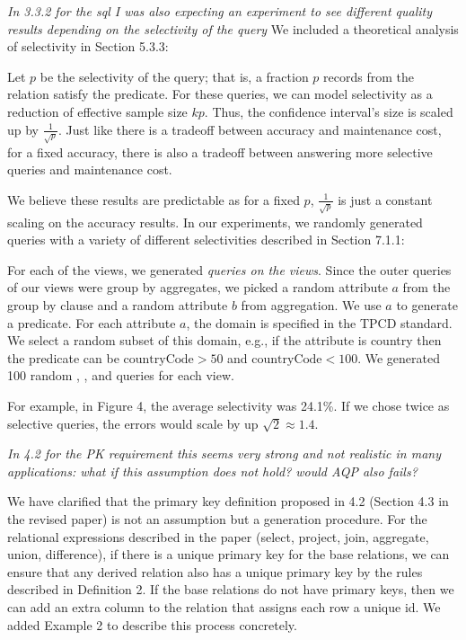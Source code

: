 \noindent\emph{In 3.3.2 for the sql I was also expecting an experiment to see different quality results depending on the selectivity of the query}
We included a theoretical analysis of selectivity in Section 5.3.3:
\begin{displayquote}
Let $p$ be the selectivity of the query; that is, a fraction $p$ records from the relation satisfy the predicate.
For these queries, we can model selectivity as a reduction of effective sample size $kp$.
Thus, the confidence interval's size is scaled up by $\frac{1}{\sqrt{p}}$.
Just like there is a tradeoff between accuracy and maintenance cost, for a fixed accuracy, 
there is also a tradeoff between answering more selective queries and maintenance cost.
\end{displayquote}
We believe these results are predictable as for a fixed $p$, $\frac{1}{\sqrt{p}}$ is just a constant scaling on the accuracy results.
In our experiments, we randomly generated queries with a variety of different selectivities described in Section 7.1.1:
\begin{displayquote}
For each of the views, we generated \emph{queries on the views}.
Since the outer queries of our views were group by aggregates, we picked a random attribute $a$ from the group by clause and a random attribute $b$ from aggregation.
We use $a$ to generate a predicate.
For each attribute $a$, the domain is specified in the TPCD standard.
We select a random subset of this domain, e.g., if the attribute is country then the predicate can be $\text{countryCode} > 50$ and $\text{countryCode} < 100$.
We generated 100 random \sumfunc, \avgfunc, and \countfunc queries for each view.
\end{displayquote}
For example, in Figure 4, the average selectivity was 24.1\%.
If we chose twice as selective queries, the errors would scale by up $\sqrt{2} \approx 1.4$.

\noindent\emph{In 4.2 for the PK requirement  this seems very strong and not realistic in many applications: what if this assumption does not hold? would AQP also fails?}

We have clarified that the primary key definition proposed in 4.2 (Section 4.3 in the revised paper) is not an assumption but a generation procedure. For the relational expressions described in the paper (select, project, join, aggregate, union, difference), if there is a unique primary key for the base relations, we can ensure that any derived relation also has a unique primary key by the rules described in Definition 2. If the base relations do not have primary keys, then we can add an extra column to the relation that assigns each row a unique id. We added Example 2 to describe this process concretely.

